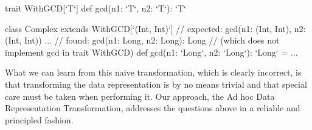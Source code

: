 \begin{lstlisting-nobreak}
trait WithGCD[`T`] {
  def gcd(n1: `T`, n2: `T`): `T`
}

class Complex extends WithGCD[`(Int, Int)`] {
  // expected: gcd(n1: (Int, Int), n2: (Int, Int)) ...
  // found:    gcd(n1: Long, n2: Long): Long
  // (which does not implement gcd in trait WithGCD)
  def gcd(n1: `Long`, n2: `Long`): `Long` = ...
}
\end{lstlisting-nobreak}

What we can learn from this naive transformation, which is clearly incorrect, is that transforming the data representation is by no means trivial and that special care must be taken when performing it. Our approach, the Ad hoc Data Representation Transformation, addresses the questions above in a reliable and principled fashion.

